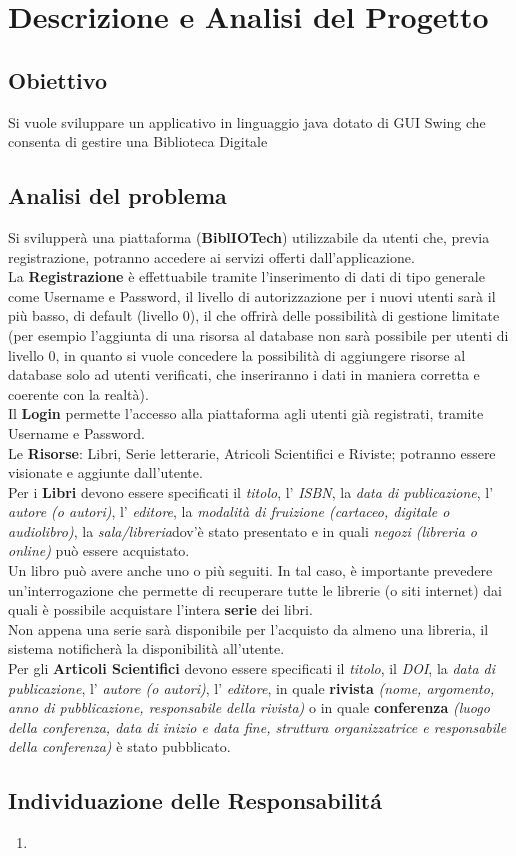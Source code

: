 \chapter{Descrizione e Analisi del Progetto}
\section{Obiettivo}
Si vuole sviluppare un applicativo in linguaggio java dotato di GUI Swing che consenta di gestire una Biblioteca Digitale
\section{Analisi del problema}
Si svilupperà una piattaforma (\textbf{BiblIOTech}) utilizzabile da utenti che, previa registrazione, potranno accedere ai servizi offerti dall'applicazione.
\\ \indent La \textbf{Registrazione} è effettuabile tramite l'inserimento di dati di tipo generale come Username e Password, il livello di autorizzazione per i nuovi utenti sarà il più basso, di default (livello 0), il che offrirà delle possibilità di gestione limitate (per esempio l'aggiunta di una risorsa al database non sarà possibile per utenti di livello 0, in quanto si vuole concedere la possibilità di aggiungere risorse al database solo ad utenti verificati, che inseriranno i dati in maniera corretta e coerente con la realtà).
\\ \indent Il \textbf{Login} permette l'accesso alla piattaforma agli utenti già registrati, tramite Username e Password.
\\ \indent Le \textbf{Risorse}: Libri, Serie letterarie, Atricoli Scientifici e Riviste; potranno essere visionate e aggiunte dall'utente.
\\ \indent Per i \textbf{Libri} devono essere specificati il \emph{titolo}, l' \emph{ISBN}, la \emph{data di publicazione}, l' \emph{autore (o autori)}, l' \emph{editore}, la \emph{modalità di fruizione (cartaceo, digitale o audiolibro)}, la \emph{sala/libreria}dov'è stato presentato e in quali \emph{negozi (libreria o online)} può essere acquistato.\\ Un libro può avere anche uno o più seguiti. In tal caso, è importante prevedere un’interrogazione che permette di recuperare tutte le librerie (o siti internet) dai quali è possibile acquistare l’intera \textbf{serie} dei libri.\\ Non appena una serie sarà disponibile per l’acquisto da almeno una libreria, il sistema notificherà la disponibilità all’utente.
\\ \indent Per gli \textbf{Articoli Scientifici} devono essere specificati il \emph{titolo}, il \emph{DOI}, la \emph{data di publicazione}, l' \emph{autore (o autori)}, l' \emph{editore}, in quale \textbf{rivista} \emph{(nome, argomento, anno di pubblicazione, responsabile della rivista)} o in quale \textbf{conferenza} \emph{(luogo della conferenza, data di inizio e data fine, struttura organizzatrice e responsabile della conferenza)} è stato pubblicato.
\section{Individuazione delle Responsabilit\'a}
\begin{enumerate}
    \item 
\end{enumerate}
